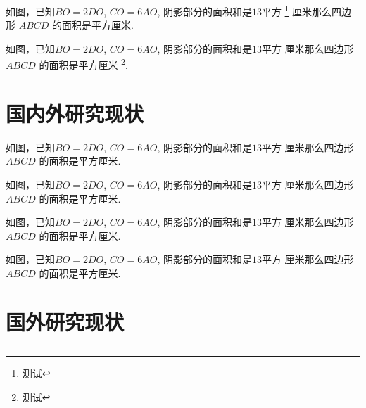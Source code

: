 \begin{question}
  \taskGrade[2]
  如图，已知$BO=2DO$, $CO=6AO$, 阴影部分的面积和是$13$平方 \footnote{测试}
  厘米那么四边形 $ABCD$ 的面积是\fillin[]平方厘米.
\end{question}

\begin{question}
  \taskGrade[5]
  如图，已知$BO=2DO$, $CO=6AO$, 阴影部分的面积和是$13$平方
  厘米那么四边形 $ABCD$ 的面积是\fillin[]平方厘米 \footnote{测试}.
\end{question}

\zhlipsum[6-7]

\newpage


\zhlipsum[6-7]

\newpage
\section{国内外研究现状}

\begin{question*}
  如图，已知$BO=2DO$, $CO=6AO$, 阴影部分的面积和是$13$平方
  厘米那么四边形 $ABCD$ 的面积是\fillin[]平方厘米.
\end{question*}

\begin{question*}
  如图，已知$BO=2DO$, $CO=6AO$, 阴影部分的面积和是$13$平方
  厘米那么四边形 $ABCD$ 的面积是\fillin[]平方厘米.
\end{question*}

\begin{question*}
  如图，已知$BO=2DO$, $CO=6AO$, 阴影部分的面积和是$13$平方
  厘米那么四边形 $ABCD$ 的面积是\fillin[]平方厘米.
\end{question*}

\begin{question*}
  如图，已知$BO=2DO$, $CO=6AO$, 阴影部分的面积和是$13$平方
  厘米那么四边形 $ABCD$ 的面积是\fillin[]平方厘米.
\end{question*}

\newpage
\section*{国外研究现状}

\subsection{}
\zhlipsum[4]

